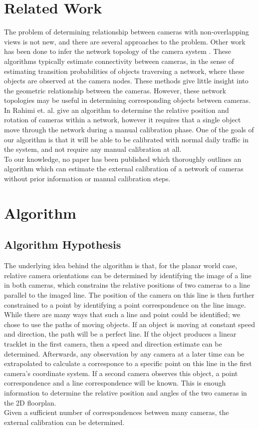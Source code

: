 \documentclass[journal]{IEEEtran}
\begin{document}
\section{Related Work}
	\indent The problem of determining relationship between cameras with non-overlapping views is not new, and there are several approaches to the problem. Other work has been done to infer the network topology of the camera system \cite{ellis2003,makris2004}. These algorithms typically estimate connectivity between cameras, in the sense of estimating transition probabilities of objects traversing a network, where these objects are observed at the camera nodes. These methods give little insight into the geometric relationship between the cameras. However, these network topologies may be useful in determining corresponding objects between cameras. \\
	\indent In \cite{rahimi2004} Rahimi et. al. give an algorithm to determine the relative position and rotation of cameras within a network, however it requires that a single object move through the network during a manual calibration phase. One of the goals of our algorithm is that it will be able to be calibrated with normal daily traffic in the system, and not require any manual calibration at all. \\
	\indent To our knowledge, no paper has been published which thoroughly outlines an algorithm which can estimate the external calibration of a network of cameras without prior information or manual calibration steps.
	
\section{Algorithm}
	\subsection{Algorithm Hypothesis}
		\indent The underlying idea behind the algorithm is that, for the planar world case, relative camera orientations can be determined by identifying the image of a line in both cameras, which constrains the relative positions of two cameras to a line parallel to the imaged line. The position of the camera on this line is then further constrained to a point by identifying a point correspondence on the line image. \\
		\indent While there are many ways that such a line and point could be identified; we chose to use the paths of moving objects. If an object is moving at constant speed and direction, the path will be a perfect line. If the object produces a linear tracklet in the first camera, then a speed and direction estimate can be determined. Afterwards, any observation by any camera at a later time can be extrapolated to calculate a corresponce to a specific point on this line in the first camera’s coordinate system. If a second camera observes this object, a point correspondence and a line correspondence will be known. This is enough information to determine the relative position and angles of the two cameras in the 2D floorplan. \\
		\indent Given a sufficient number of correspondences between many cameras, the external calibration can be determined.
		
\end{document}
